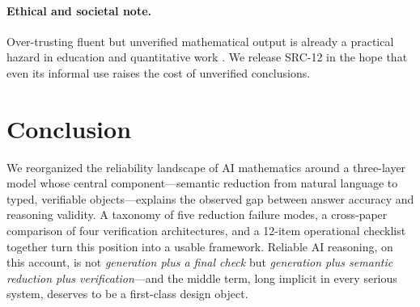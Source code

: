 \documentclass[11pt,a4paper]{article}
\begin{document}
\paragraph{Ethical and societal note.} Over-trusting fluent but unverified mathematical output is already a practical hazard in education and quantitative work \citep{frieder2023chatgpt}. We release SRC-12 in the hope that even its informal use raises the cost of unverified conclusions.

\section{Conclusion}\label{sec:conclusion}

We reorganized the reliability landscape of AI mathematics around a three-layer model whose central component---semantic reduction from natural language to typed, verifiable objects---explains the observed gap between answer accuracy and reasoning validity. A taxonomy of five reduction failure modes, a cross-paper comparison of four verification architectures, and a 12-item operational checklist together turn this position into a usable framework. Reliable AI reasoning, on this account, is not \emph{generation plus a final check} but \emph{generation plus semantic reduction plus verification}---and the middle term, long implicit in every serious system, deserves to be a first-class design object.



\end{document}
